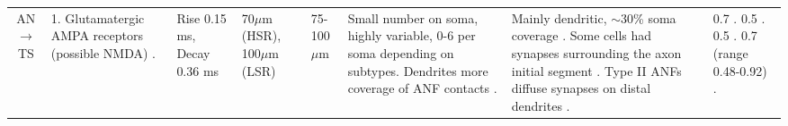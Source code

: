 \begin{longtable}{cXXXXXXX}
AN\ensuremath{\rightarrow}TS                       
& %
1. Glutamatergic AMPA receptors (possible NMDA) \citep{FerragamoGoldingEtAl:1998a}. 
& %
Rise 0.15 ms,  Decay 0.36 ms \citep{GardnerTrussellEtAl:1999}
& %
70$\mu$m (HSR), 100$\mu$m (LSR)  \citep[Single fibres][]{OertelWuEtAl:1990,Ryugo:2008,MeltzerRyugo:2006,RyugoParks:2003,Ryugo:1992,BrownBerglundEtAl:1988,RoullierCronin-SchreiberEtAl:1986,FeketeRouillerEtAl:1984} 
& %
75-100$\mu$m \citep[Mouse]{OertelWuEtAl:1990} 
& %
Small number on soma, highly variable, 0-6 per soma depending on subtypes. Dendrites more coverage of ANF contacts \citep{Cant:1981,FayPopper:1994,ReddCahillEtAl:2002,RyugoWrigthEtAl:1993,Ryugo:1992,RyugoParks:2003,FerragamoGoldingEtAl:1998a,SmithRhode:1989,JosephsonMorest:1998}.
& %
Mainly dendritic, $\sim$30\% soma coverage \citep[Cat][]{Cant:1981,Cant:1982,RyugoWrightEtAl:1993,TolbertMorest:1982a}. 
\citep[cat][Soma: 36$\pm$10.5 \%  of 21 (range 6-38) \% area coverage, Prox: 43$\pm$29 \%  of 46 \% area cov., Distal: 40$\pm$12 \%  of 22 \% area cov.]{SmithRhode:1989}
Some cells had synapses surrounding the axon initial segment \citep{JosephsonMorest:1998}. 
Type II ANFs diffuse synapses on distal dendrites \citep{BensonBrown:2004}.
& %
0.7  \citep[Mouse, slice prep., AN shock][]{Oertel:1983}. 
0.5  \citep[theoretical][]{Brown:1993,BrownLedwith:1990}.
0.5  \citep[Chinchilla][]{WickesbergOertel:1993}. 
0.7 (range 0.48-0.92) \citep[Mouse, slice prep., AN shock][]{FerragamoGoldingEtAl:1998a}. 

\end{longtable}
